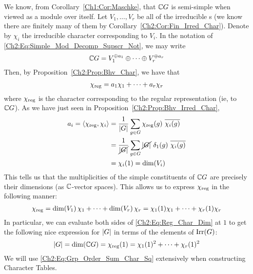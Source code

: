 \begin{boxexample}\label{Ch2:Eg:Mult_Reg_Rep}
    We know, from Corollary~\ref{Ch1:Cor:Maschke}, that $\mathbb{C} G$ is semi-simple when viewed as a module over itself. Let $V_1, \ldots, V_r$ be all of the irreducible \CGM s (we know there are finitely many of them by Corollary~\ref{Ch2:Cor:Fin_Irred_Char}). Denote by $\chi_i$ the irreducible character corresponding to $V_i$. In the notation of \eqref{Ch2:Eq:Simple_Mod_Decomp_Supscr_Not}, we may write
    \begin{align*}
        \mathbb{C} G = V_1^{\oplus a_1} \oplus \cdots \oplus V_r^{\oplus a_r}
    \end{align*}
    Then, by Proposition~\ref{Ch2:Prop:Bhv_Char}, we have that
    \begin{align*}
        \chi_{\operatorname{reg}} = a_1 \chi_1 + \cdots + a_r \chi_r
    \end{align*}
    where $\chi_{\operatorname{reg}}$ is the character corresponding to the regular representation (ie, to $\mathbb{C} G$). As we have just seen in Proposition~\ref{Ch2:Prop:Bhv_Irred_Char},
    \begin{align*}
        a_i = \left\langle \chi_{\operatorname{reg}}, \chi_i \right\rangle &= \frac{1}{\left\lvert G \right\rvert} \sum_{g \in G} \chi_{\operatorname{reg}}(g) \ \overline{\chi_i(g)} \\
        &= \frac{1}{\cancel{\left\lvert G \right\rvert}} \sum_{g \in G} {\cancel{\left\lvert G \right\rvert} \ \delta_1(g)} \ \overline{\chi_{i}\!\left( g \right)} \\
        &= \chi_{i}\!\left( 1 \right) = \dim\!\left( V_i \right)
    \end{align*}
    This tells us that the multiplicities of the simple constituents of $\mathbb{C} G$ are precisely their dimensions (as $\mathbb{C}$-vector spaces). This allows us to express $\chi_{\operatorname{reg}}$ in the following manner:
    \begin{align}
        \chi_{\operatorname{reg}} = \dim\!\left( V_1 \right) \chi_1 + \cdots + \dim\!\left( V_r \right) \chi_r = \chi_1(1) \chi_1 + \cdots + \chi_r(1) \chi_r
        \label{Ch2:Eq:Reg_Char_Dim}
    \end{align}
    In particular, we can evaluate both sides of \eqref{Ch2:Eq:Reg_Char_Dim} at $1$ to get the following nice expression for $\left\lvert G \right\rvert$ in terms of the elements of $\operatorname{Irr}\!\left( G \right)$:
    \begin{align}
        \left\lvert G \right\rvert = \dim\!\left( \mathbb{C} G \right) = \chi_{\operatorname{reg}}(1) = \chi_1(1)^2 + \cdots + \chi_r(1)^2
        \label{Ch2:Eq:Grp_Order_Sum_Char_Sq}
    \end{align}
    We will use \eqref{Ch2:Eq:Grp_Order_Sum_Char_Sq} extensively when constructing Character Tables.
\end{boxexample}

